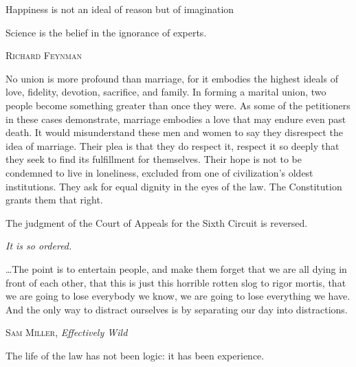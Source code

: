 \documentclass[../butidigress.tex]{subfiles}
\begin{document}
\postepi
\epigraph{Happiness is not an ideal of reason but of imagination}{}
\postepi
\epigraph{Science is the belief in the ignorance of experts.}{\textsc{Richard Feynman}}
\postepi
\epigraph{No union is more profound than marriage, for it embodies the highest ideals of love, fidelity, devotion, sacrifice, and family. In forming a marital union, two people become something greater than once they were. As some of the petitioners in these cases demonstrate, marriage embodies a love that may endure even past death. It would misunderstand these men and women to say they disrespect the idea of marriage. Their plea is that they do respect it, respect it so deeply that they seek to find its fulfillment for themselves. Their hope is not to be condemned to live in loneliness, excluded from one of civilization's oldest institutions. They ask for equal dignity in the eyes of the law. The Constitution grants them that right.\par\hspace*{2em} The judgment of the Court of Appeals for the Sixth Circuit is reversed. \par\hfill \textit{It is so ordered.}}{}
\postepi
\epigraph{\ldots The point is to entertain people, and make them forget that we are all dying in front of each other, that this is just this horrible rotten slog to rigor mortis, that we are going to lose everybody we know, we are going to lose everything we have. And the only way to distract ourselves is by separating our day into distractions.}{\textsc{Sam Miller}, \textit{Effectively Wild}}
\postepi
\epigraph{The life of the law has not been logic: it has been experience.}{}
\end{document}
